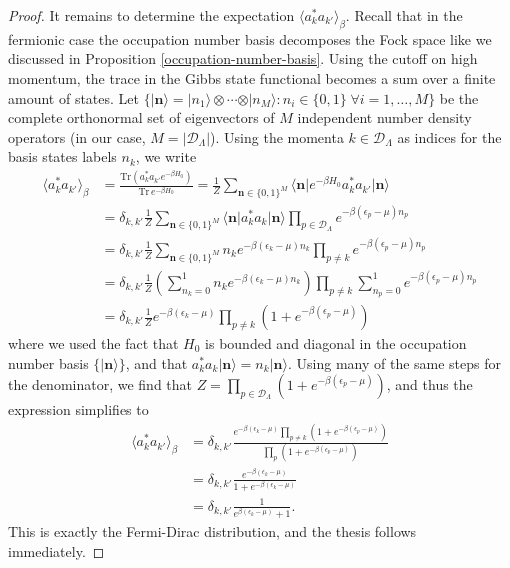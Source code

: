 \begin{proof}
	It remains to determine the expectation $\langle a^*_k a_{k'}\rangle_\beta$. Recall that
	in the fermionic case the occupation number basis decomposes the Fock space like we
	discussed in Proposition \ref{occupation-number-basis}. Using the cutoff on high momentum,
	the trace in the Gibbs state functional becomes a sum over a finite amount of states. Let
	$\{\vert\boldsymbol{n}\rangle = \vert n_1\rangle\otimes\cdots\otimes\vert n_M\rangle
	: n_i\in\{0,1\}\;\forall i=1,\ldots,M\}$
	be the complete orthonormal set of eigenvectors of $M$ independent number density operators
	(in our case, $M=\vert\mathcal{D}_\Lambda\vert$). Using the momenta
	$k\in\mathcal{D}_\Lambda$ as indices for the basis states labels $n_k$, we write
	\begin{align*}
		\langle a^*_k a_{k'} \rangle_\beta
		&= \frac{\mathrm{Tr}(a^*_k a_{k'}e^{-\beta H_0})}{\mathrm{Tr}\,e^{-\beta H_0}}
		= \frac{1}{Z} \sum_{\boldsymbol{n}\in\{0,1\}^M}\langle\boldsymbol{n}\vert e^{-\beta H_0}a^*_k a_{k'}\vert\boldsymbol{n}\rangle\\
		&= \delta_{k,k'} \frac{1}{Z} \sum_{\boldsymbol{n}\in\{0,1\}^M}\langle\boldsymbol{n}\vert a^*_k a_k \vert\boldsymbol{n}\rangle\prod_{p\in\mathcal{D}_\Lambda}e^{-\beta(\epsilon_p-\mu)n_p}\\
		&= \delta_{k,k'} \frac{1}{Z} \sum_{\boldsymbol{n}\in\{0,1\}^M} n_k e^{-\beta(\epsilon_k-\mu)n_k} \prod_{p\neq k} e^{-\beta(\epsilon_p-\mu)n_p}\\
		&= \delta_{k,k'} \frac{1}{Z} \left(\sum_{n_k=0}^1 n_k e^{-\beta(\epsilon_k-\mu)n_k}\right)\prod_{p\neq k}\sum_{n_p=0}^1 e^{-\beta(\epsilon_p-\mu)n_p}\\
		&= \delta_{k,k'} \frac{1}{Z} e^{-\beta(\epsilon_k-\mu)}\prod_{p\neq k}(1 + e^{-\beta(\epsilon_p-\mu)})
	\end{align*}
	where we used the fact that $H_0$ is bounded and diagonal in the occupation number basis
	$\{\vert\boldsymbol{n}\rangle\}$, and that $a^*_k a_k\vert\boldsymbol{n}\rangle=n_k\vert\boldsymbol{n}\rangle$.
	Using many of the same steps for the denominator, we find that
	$Z=\prod_{p\in\mathcal{D}_\Lambda}(1+e^{-\beta(\epsilon_p-\mu)})$, and thus the expression
	simplifies to
	\begin{align*}
		\langle a^*_k a_{k'}\rangle_\beta
		&= \delta_{k,k'} \frac{e^{-\beta(\epsilon_k-\mu)}\prod_{p\neq k}(1 + e^{-\beta(\epsilon_p-\mu)})}{\prod_{p}(1 + e^{-\beta(\epsilon_p-\mu)})}\\
		&= \delta_{k,k'} \frac{e^{-\beta(\epsilon_k-\mu)}}{1 + e^{-\beta(\epsilon_k-\mu)}}\\
		&= \delta_{k,k'} \frac{1}{e^{\beta(\epsilon_k-\mu)}+1}.
	\end{align*}
	This is exactly the Fermi-Dirac distribution, and the thesis follows immediately.
\end{proof}

